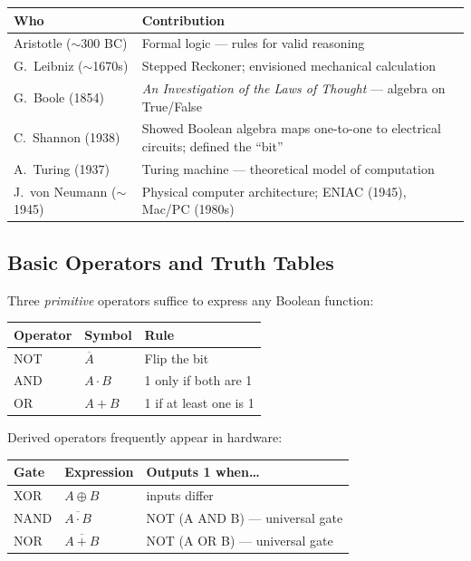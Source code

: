 \documentclass[oneside]{book}
\begin{document}
\begin{center}
\begin{tabularx}{\linewidth}{lX}
\toprule
\textbf{Who} & \textbf{Contribution} \\
\midrule
Aristotle ($\sim$300 BC) & Formal logic — rules for valid reasoning \\
G.\ Leibniz ($\sim$1670s) & Stepped Reckoner; envisioned mechanical calculation \\
G.\ Boole (1854) & \emph{An Investigation of the Laws of Thought} — algebra on True/False \\
C.\ Shannon (1938) & Showed Boolean algebra maps one-to-one to electrical circuits; defined the ``bit'' \\
A.\ Turing (1937) & Turing machine — theoretical model of computation \\
J.\ von Neumann ($\sim$1945) & Physical computer architecture; ENIAC (1945), Mac/PC (1980s) \\
\bottomrule
\end{tabularx}
\end{center}


\subsection*{Basic Operators and Truth Tables}

Three \emph{primitive} operators suffice to express any Boolean function:

\begin{center}
\begin{tabularx}{0.55\linewidth}{lll}
\toprule
\textbf{Operator} & \textbf{Symbol} & \textbf{Rule} \\
\midrule
NOT & $\overline{A}$ & Flip the bit \\
AND & $A \cdot B$ & 1 only if both are 1 \\
OR  & $A + B$ & 1 if at least one is 1 \\
\bottomrule
\end{tabularx}
\end{center}

Derived operators frequently appear in hardware:

\begin{center}
\begin{tabularx}{0.72\linewidth}{llX}
\toprule
\textbf{Gate} & \textbf{Expression} & \textbf{Outputs 1 when\ldots} \\
\midrule
XOR  & $A \oplus B$              & inputs differ \\
NAND & $\overline{A \cdot B}$    & NOT (A AND B) — universal gate \\
NOR  & $\overline{A + B}$        & NOT (A OR B) — universal gate \\
\bottomrule
\end{tabularx}
\end{center}
\end{document}
